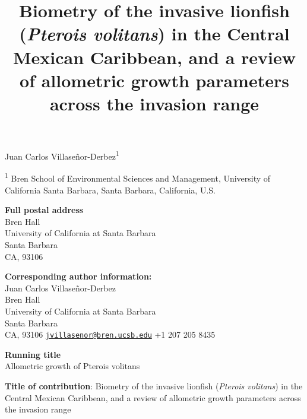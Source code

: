 \documentclass[12pt,]{article}
\title{\normalsize{Biometry of the invasive lionfish (\textit{Pterois volitans}) in the Central Mexican Caribbean, and a review of allometric growth parameters across the invasion range}}
\author{}
\date{}
\begin{document}
\maketitle

Juan Carlos Villaseñor-Derbez\textsuperscript{1}

\textsuperscript{1} Bren School of Environmental Sciences and
Management, University of California Santa Barbara, Santa Barbara,
California, U.S.

\textbf{Full postal address}\\
Bren Hall\\
University of California at Santa Barbara\\
Santa Barbara\\
CA, 93106

\textbf{Corresponding author information:}\\
Juan Carlos Villaseñor-Derbez\\
Bren Hall\\
University of California at Santa Barbara\\
Santa Barbara\\
CA, 93106
\href{mailto:jvillasenor@bren.ucsb.edu}{\nolinkurl{jvillasenor@bren.ucsb.edu}}
+1 207 205 8435

\textbf{Running title}\\
Allometric growth of Pterois volitans

\clearpage

\textbf{Title of contribution}: Biometry of the invasive lionfish
(\emph{Pterois volitans}) in the Central Mexican Caribbean, and a review
of allometric growth parameters across the invasion range
\end{document}
